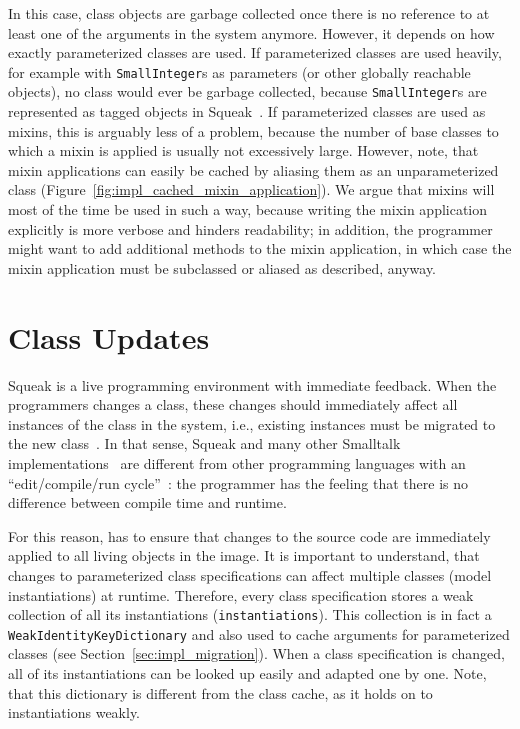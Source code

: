 In this case, class objects are garbage collected once there is no reference to at least one of the arguments in the system anymore. However, it depends on how exactly parameterized classes are used. If parameterized classes are used heavily, for example with \texttt{SmallInteger}s as parameters (or other globally reachable objects), no class would ever be garbage collected, because \texttt{SmallInteger}s are represented as tagged objects in Squeak~\cite{Bolz:2008:BFO:1482373.1482382, papetechreport}. If parameterized classes are used as mixins, this is arguably less of a problem, because the number of base classes to which a mixin is applied is usually not excessively large. However, note, that mixin applications can easily be cached by aliasing them as an unparameterized class (Figure~\ref{fig:impl_cached_mixin_application}). We argue that mixins will most of the time be used in such a way, because writing the mixin application explicitly is more verbose and hinders readability; in addition, the programmer might want to add additional methods to the mixin application, in which case the mixin application must be subclassed or aliased as described, anyway.

\section{Class Updates}
Squeak is a live programming environment with immediate feedback. When the programmers changes a class, these changes should immediately affect all instances of the class in the system, i.e., existing instances must be migrated to the new class~\cite{casaccio2011bootstrapping}. In that sense, Squeak and many other Smalltalk implementations~\cite{Penney:1987:CMG:38765.38817} are different from other programming languages with an ``edit/compile/run cycle''~\cite{conf/sofsem/NierstraszG10}: the programmer has the feeling that there is no difference between compile time and runtime.

For this reason, \msname has to ensure that changes to the source code are immediately applied to all living objects in the image. It is important to understand, that changes to parameterized class specifications can affect multiple classes (model instantiations) at runtime. Therefore, every class specification stores a weak collection of all its instantiations (\texttt{instantiations}). This collection is in fact a \texttt{WeakIdentityKeyDictionary} and also used to cache arguments for parameterized classes (see Section~\ref{sec:impl_migration}). When a class specification is changed, all of its instantiations can be looked up easily and adapted one by one. Note, that this dictionary is different from the class cache, as it holds on to instantiations weakly.

